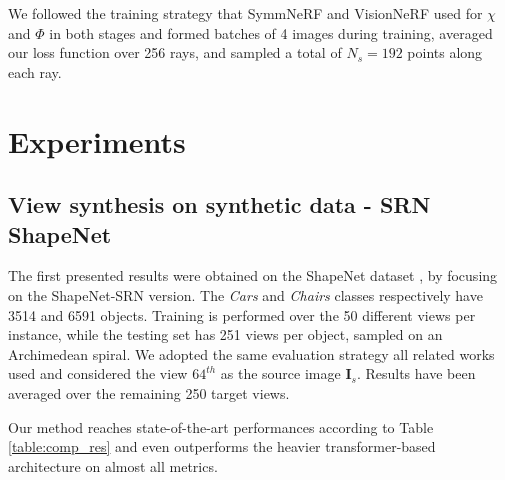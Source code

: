 We followed the training strategy that SymmNeRF \citep{li2022symmnerf} and VisionNeRF \citep{lin2023vision} used for $\chi$ and $\Phi$ in both stages and formed batches of 4 images during training, averaged our loss function over 256 rays, and sampled a total of $N_{s}=192$ points along each ray.

\section{Experiments}
\subsection{View synthesis on synthetic data - SRN ShapeNet}
The first presented results were obtained on the ShapeNet dataset \citep{chang2015shapenet}, by focusing on the ShapeNet-SRN \citep{sitzmann2019scene} version. The \textit{Cars} and \textit{Chairs} classes respectively have 3514 and 6591 objects. Training is performed over the 50 different views per instance, while the testing set has 251 views per object, sampled on an Archimedean spiral. We adopted the same evaluation strategy all related works used and considered the view $64^{th}$ as the source image $\textbf{I}_{s}$. Results have been  averaged over the remaining 250 target views. 

Our method reaches state-of-the-art performances according to Table \ref{table:comp_res} and even outperforms the heavier transformer-based architecture \citep{lin2023vision} on almost all metrics. 

